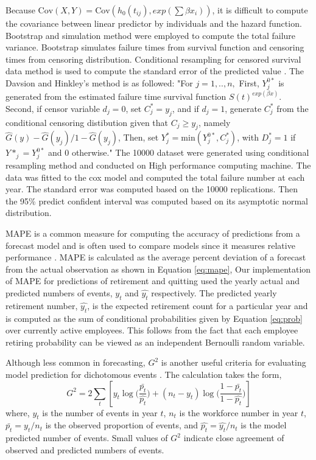 Because $\mathrm{Cov}(X,Y)=\mathrm{Cov}(h_0(t_{ij}),exp(\sum {\beta x_i}))$, it is difficult to compute the covariance between linear predictor by individuals and the hazard function. Bootstrap and simulation method were employed to compute the total failure variance. Bootstrap simulates failure times from survival function and censoring times from censoring distribution. Conditional resampling for censored survival data method is used to compute the standard error of the predicted value \citep{davison1997}. The Davsion and Hinkley's method is as followed:
"For $j=1,..,n,$
First, $Y_j^{0*}$ is generated from the estimated failure time survival function $S(t)^{exp(\beta x)}$. Second, if censor variable $d_j=0$, set $C^*_j=y_j$, and if $d_j=1$, generate  $C^*_j$ from the conditional censoring distibution given that $C_j\ge y_j$, namely {${\hat{G}(y)-\hat{G}(y_j)}/{1-\hat{G}(y_j)}$}, Then, set $Y^*_j=\mathrm{min}(Y_j^{0*},C^*_j)$, with $D^*_j=1$ if $Y*_j=Y_j^{0*}$ and 0 otherwise."
The 10000 dataset were generated using conditional resampling method and conducted on High performance computing machine. The data was fitted to the cox model and computed the total failure number at each year. The standard error was computed based on the 10000 replications. Then the 95\% predict confident interval was computed based on its asymptotic normal distribution.  


MAPE is a common measure for computing the accuracy of predictions from a forecast model and is often used to compare models since it measures relative performance \citep{Chu1998}. MAPE is calculated as the average percent deviation of a forecast from the actual observation as shown in Equation \ref{eq:mape},
Our implementation of MAPE for predictions of retirement and quitting used the yearly actual and predicted numbers of events, $y_t$ and $\hat{y_t}$ respectively. The predicted yearly retirement number, $\hat{y_t}$,  is the expected retirement count for a particular year and is computed as the sum of conditional probabilities given by Equation \ref{eq:prob} over currently active employees. This follows from the fact that each employee retiring probability can be viewed as an independent Bernoulli random variable.


Although less common in forecasting, $G^2$ is another useful criteria for evaluating model prediction for dichotomous events \citep{Simonoff2013}. The calculation takes the form,
\begin{equation}
\label{eq:g2}
G^2=2\sum_{t}[y_t\log{(\frac{\bar{p_t}}{\hat{p_t}}})+ (n_t-y_t)\log{(\frac{1-\bar{p_t}}{1-\hat{p_t}}})]
\end{equation}
where, $y_t$ is the number of events in year $t$, $n_t$ is the workforce number in year $t$, $\bar{p_t}={y_t}/{n_t}$ is the observed proportion of events, and $\hat{p_t}={\hat{y_t}}/{n_t} $ is the model predicted number of events.  Small values of $G^2$ indicate close agreement of observed and predicted numbers of events.

